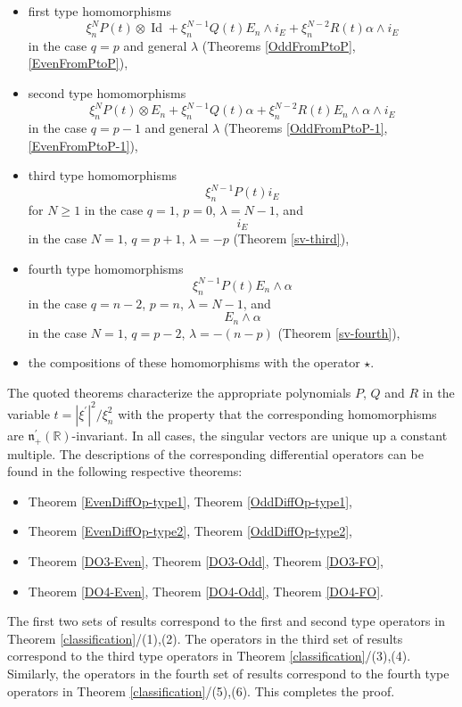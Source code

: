 \documentclass[a4paper,12pt,reqno]{amsart}
\numberwithin{theorem}{subsection}
\numberwithin{equation}{section}
\begin{document}
\begin{itemize}
\item first type homomorphisms
\begin{equation*}
   \xi_n^{N} P(t) \otimes {\operatorname{Id}} + \xi_n^{N-1} Q(t) E_n \wedge i_E + \xi_n^{N-2} R(t) \alpha \wedge i_E
\end{equation*}
in the case $q=p$ and general $\lambda$ (Theorems \ref{OddFromPtoP},
\ref{EvenFromPtoP}),
\item second type homomorphisms
\begin{equation*}
   \xi_n^{N} P(t) \otimes E_n + \xi_n^{N-1} Q(t) \alpha + \xi_n^{N-2} R(t) E_n \wedge \alpha \wedge i_E
\end{equation*}
in the case $q=p-1$ and general $\lambda$ (Theorems \ref{OddFromPtoP-1},
\ref{EvenFromPtoP-1}),
\item third type homomorphisms
\begin{equation*}
   \xi_n^{N-1} P(t) i_E
\end{equation*}
for $N \ge 1$ in the case $q=1$, $p=0$, $\lambda=N-1$, and
$$
   i_E
$$
in the case $N=1$, $q=p+1$, $\lambda=-p$ (Theorem \ref{sv-third}),
\item fourth type homomorphisms
\begin{equation*}
   \xi_n^{N-1} P(t) E_n \wedge \alpha
\end{equation*}
in the case $q=n-2$, $p=n$, $\lambda=N-1$, and
$$
   E_n \wedge \alpha
$$
in the case $N=1$, $q=p-2$, $\lambda=-(n-p)$ (Theorem \ref{sv-fourth}),
\item the compositions of these homomorphisms with the operator $\star$.
\end{itemize}
The quoted theorems characterize the appropriate polynomials $P$, $Q$ and $R$
in the variable $t = |\xi^\prime|^2/\xi_n^2$ with the property that the
corresponding homomorphisms are ${{\mathfrak n}}_+^\prime({\mathbb{R}})$-invariant. In all cases,
the singular vectors are unique up a constant multiple. The descriptions of the
corresponding differential operators can be found in the following respective
theorems:
\begin{itemize}
\item Theorem \ref{EvenDiffOp-type1}, Theorem \ref{OddDiffOp-type1},
\item Theorem \ref{EvenDiffOp-type2}, Theorem \ref{OddDiffOp-type2},
\item Theorem \ref{DO3-Even}, Theorem \ref{DO3-Odd}, Theorem \ref{DO3-FO},
\item Theorem \ref{DO4-Even}, Theorem \ref{DO4-Odd}, Theorem \ref{DO4-FO}.
\end{itemize}
The first two sets of results correspond to the first and second type operators
in Theorem \ref{classification}/(1),(2). The operators in the third set of
results correspond to the third type operators in Theorem
\ref{classification}/(3),(4). Similarly, the operators in the fourth set of
results correspond to the fourth type operators in Theorem
\ref{classification}/(5),(6). This completes the proof.
\end{document}
